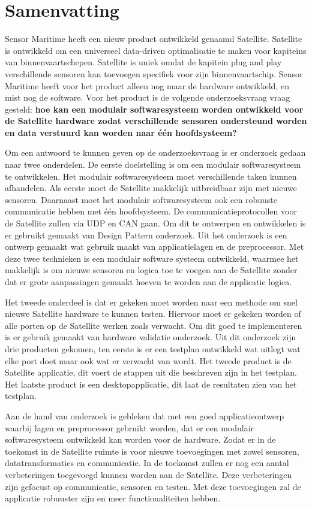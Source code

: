 \chapter*{Samenvatting}
Sensor Maritime heeft een nieuw product ontwikkeld genaamd Satellite. Satellite is ontwikkeld om een universeel data-driven optimalisatie te maken voor kapiteins van binnenvaartschepen. Satellite is uniek omdat de kapitein plug and play verschillende sensoren kan toevoegen specifiek voor zijn binnenvaartschip. Sensor Maritime heeft voor het product alleen nog maar de hardware ontwikkeld, en mist nog de software. Voor het product is de volgende onderzoeksvraag vraag gesteld: \textbf{hoe kan een modulair softwaresysteem worden ontwikkeld voor de Satellite hardware zodat verschillende sensoren ondersteund worden en data verstuurd kan worden naar één hoofdsysteem?} \newline

\noindent Om een antwoord te kunnen geven op de onderzoeksvraag is er onderzoek gedaan naar twee onderdelen. De eerste doelstelling is om een modulair softwaresysteem te ontwikkelen. Het modulair softwaresysteem moet verschillende taken kunnen afhandelen. Als eerste moet de Satellite makkelijk uitbreidbaar zijn met nieuwe sensoren. Daarnaast moet het modulair softwaresysteem ook een robuuste communicatie hebben met één hoofdsysteem. De communicatieprotocollen voor de Satellite zullen via UDP en CAN gaan. Om dit te ontwerpen en ontwikkelen is er gebruikt gemaakt van Design Pattern onderzoek. Uit het onderzoek is een ontwerp gemaakt wat gebruik maakt van applicatielagen en de preprocessor. Met deze twee technieken is een modulair software systeem ontwikkeld, waarmee het makkelijk is om nieuwe sensoren en logica toe te voegen aan de Satellite zonder dat er grote aanpassingen gemaakt hoeven te worden aan de applicatie logica. \newline

\noindent Het tweede onderdeel is dat er gekeken moet worden naar een methode om snel nieuwe Satellite hardware te kunnen testen. Hiervoor moet er gekeken worden of alle porten op de Satellite werken zoals verwacht. Om dit goed te implementeren is er gebruik gemaakt van hardware validatie onderzoek. Uit dit onderzoek zijn drie producten gekomen, ten eerste is er een testplan ontwikkeld wat uitlegt wat elke port doet maar ook wat er verwacht van wordt. Het tweede product is de Satellite applicatie, dit voert de stappen uit die beschreven zijn in het testplan. Het laatste product is een desktopapplicatie, dit laat de resultaten zien van het testplan. \newline


\noindent Aan de hand van onderzoek is gebleken dat met een goed applicatieontwerp waarbij lagen en preprocessor gebruikt worden, dat er een modulair softwaresysteem ontwikkeld kan worden voor de hardware. Zodat er in de toekomst in de Satellite ruimte is voor nieuwe toevoegingen met zowel sensoren, datatransformaties en communicatie. In de toekomst zullen er nog een aantal verbeteringen toegevoegd kunnen worden aan de Satellite. Deze verbeteringen zijn gefocust op communicatie, sensoren en testen. Met deze toevoegingen zal de applicatie robuuster zijn en meer functionaliteiten hebben.
